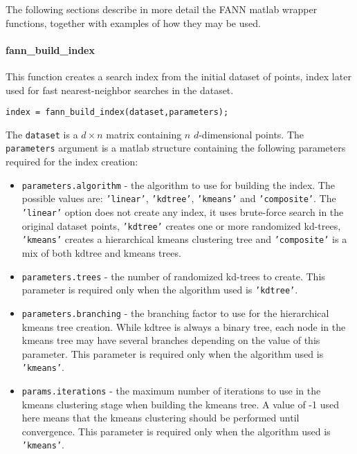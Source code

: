 \documentclass[letter,10pt]{article}
\begin{document}
The following sections describe in more detail the FANN matlab wrapper functions, together with examples of how they may be used.

\paragraph{fann\_build\_index} 

This function creates a search index from the initial dataset of points, index later used for fast nearest-neighbor searches in the dataset.
\begin{Verbatim}
index = fann_build_index(dataset,parameters);
\end{Verbatim}

The \texttt{dataset} is a $d \times n$ matrix containing $n$ $d$-dimensional points. The \texttt{parameters} argument is a matlab structure containing the following parameters required for the index creation:
\begin{itemize}
	\item \texttt{parameters.algorithm} - the algorithm to use for building the index. The possible values are: \texttt{'linear'}, \texttt{'kdtree'}, \texttt{'kmeans'} and \texttt{'composite'}. The \texttt{'linear'} option does not create any index, it uses brute-force search in the original dataset points, \texttt{'kdtree'} creates one or more randomized kd-trees, \texttt{'kmeans'} creates a hierarchical kmeans clustering tree and \texttt{'composite'} is a mix of both kdtree and kmeans trees.
	
	\item \texttt{parameters.trees} - the number of randomized kd-trees to create. This parameter is required only when the algorithm used is \texttt{'kdtree'}.
	
	\item \texttt{parameters.branching} - the branching factor to use for the hierarchical kmeans tree creation. While kdtree is always a binary tree, each node in the kmeans tree may have several branches depending on the value of this parameter. This parameter is required only when the algorithm used is \texttt{'kmeans'}.
	
	\item \texttt{params.iterations} - the maximum number of iterations to use in the kmeans clustering stage when building the kmeans tree. A value of -1 used here means that the kmeans clustering should be performed until convergence. This parameter is required only when the algorithm used is \texttt{'kmeans'}.
\end{itemize}
\end{document}
